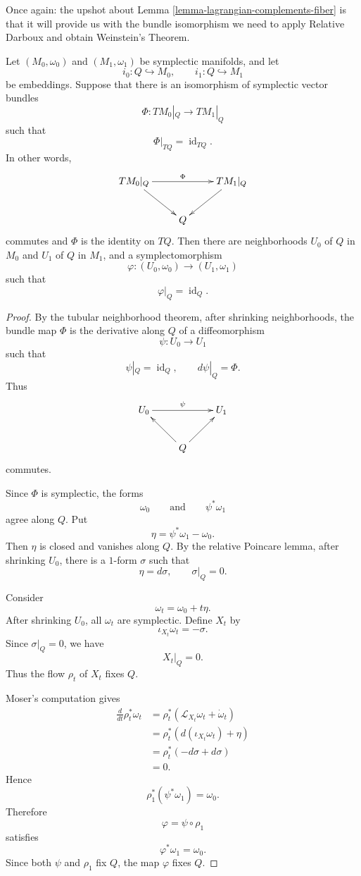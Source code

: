 Once again: the upshot about 
Lemma 
\ref{lemma-lagrangian-complements-fiber}
is that it will provide us with the
bundle isomorphism we need to apply
Relative Darboux and obtain Weinstein's
Theorem.

\begin{theorem}
\label{theorem-relative-darboux}
Let $(M_0,\omega_0)$ and $(M_1,\omega_1)$
be symplectic manifolds, and let
$$
i_0:Q\hookrightarrow M_0,
\qquad
i_1:Q\hookrightarrow M_1
$$
be embeddings. Suppose that there is an
isomorphism of symplectic vector bundles
$$
\Phi:TM_0|_Q\longrightarrow TM_1|_Q
$$
such that
$$
\Phi|_{TQ}=\operatorname{id}_{TQ}.
$$
In other words,
$$
\xymatrix{
TM_0|_Q \ar[rr]^-{\Phi} \ar[dr]
&& TM_1|_Q \ar[dl]\\
& Q &
}
$$
commutes and $\Phi$ is the identity on
$TQ$. Then there are neighborhoods $U_0$
of $Q$ in $M_0$ and $U_1$ of $Q$ in
$M_1$, and a symplectomorphism
$$
\varphi:(U_0,\omega_0)\longrightarrow
(U_1,\omega_1)
$$
such that
$$
\varphi|_Q=\operatorname{id}_Q.
$$
\end{theorem}

\begin{proof}
By the tubular neighborhood theorem, after
shrinking neighborhoods, the bundle map
$\Phi$ is the derivative along $Q$ of a
diffeomorphism
$$
\psi:U_0\longrightarrow U_1
$$
such that
$$
\psi|_Q=\operatorname{id}_Q,
\qquad
d\psi|_Q=\Phi.
$$
Thus
$$
\xymatrix{
U_0 \ar[rr]^-{\psi}
&& U_1\\
& Q \ar[ul] \ar[ur] &
}
$$
commutes.

\medskip\noindent
Since $\Phi$ is symplectic, the forms
$$
\omega_0
\qquad\text{and}\qquad
\psi^*\omega_1
$$
agree along $Q$. Put
$$
\eta=\psi^*\omega_1-\omega_0.
$$
Then $\eta$ is closed and vanishes along
$Q$. By the relative Poincare lemma, after
shrinking $U_0$, there is a $1$-form
$\sigma$ such that
$$
\eta=d\sigma,
\qquad
\sigma|_Q=0.
$$

\medskip\noindent
Consider
$$
\omega_t=\omega_0+t\eta.
$$
After shrinking $U_0$, all $\omega_t$ are
symplectic. Define $X_t$ by
$$
\iota_{X_t}\omega_t=-\sigma.
$$
Since $\sigma|_Q=0$, we have
$$
X_t|_Q=0.
$$
Thus the flow $\rho_t$ of $X_t$ fixes $Q$.

\medskip\noindent
Moser's computation gives
\begin{align*}
\frac{d}{dt}\rho_t^*\omega_t
&=
\rho_t^*
\left(
\mathcal L_{X_t}\omega_t+\dot\omega_t
\right)\\
&=
\rho_t^*
\left(
d(\iota_{X_t}\omega_t)+\eta
\right)\\
&=
\rho_t^*(-d\sigma+d\sigma)\\
&=0.
\end{align*}
Hence
$$
\rho_1^*(\psi^*\omega_1)=\omega_0.
$$
Therefore
$$
\varphi=\psi\circ \rho_1
$$
satisfies
$$
\varphi^*\omega_1=\omega_0.
$$
Since both $\psi$ and $\rho_1$ fix $Q$,
the map $\varphi$ fixes $Q$.
\end{proof}

